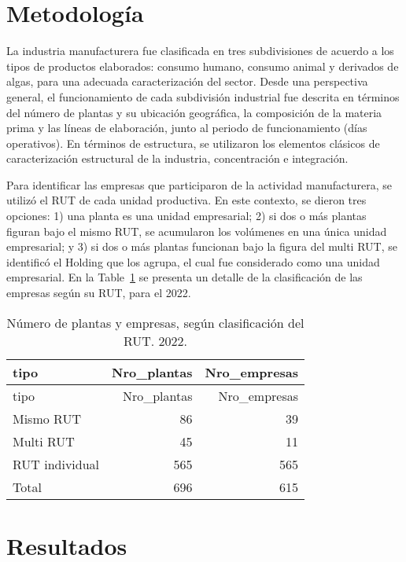 \documentclass[
  super,
  preprint,
  3p]{elsarticle}
\begin{document}
\hypertarget{metodologuxeda}{%
\section{Metodología}\label{metodologuxeda}}

La industria manufacturera fue clasificada en tres subdivisiones de
acuerdo a los tipos de productos elaborados: consumo humano, consumo
animal y derivados de algas, para una adecuada caracterización del
sector. Desde una perspectiva general, el funcionamiento de cada
subdivisión industrial fue descrita en términos del número de plantas y
su ubicación geográfica, la composición de la materia prima y las líneas
de elaboración, junto al periodo de funcionamiento (días operativos). En
términos de estructura, se utilizaron los elementos clásicos de
caracterización estructural de la industria, concentración e
integración.

Para identificar las empresas que participaron de la actividad
manufacturera, se utilizó el RUT de cada unidad productiva. En este
contexto, se dieron tres opciones: 1) una planta es una unidad
empresarial; 2) si dos o más plantas figuran bajo el mismo RUT, se
acumularon los volúmenes en una única unidad empresarial; y 3) si dos o
más plantas funcionan bajo la figura del multi RUT, se identificó el
Holding que los agrupa, el cual fue considerado como una unidad
empresarial. En la Table~\ref{tbl-a} se presenta un detalle de la
clasificación de las empresas según su RUT, para el 2022.

\hypertarget{tbl-a}{}
\begin{longtable}[]{@{}lrr@{}}
\caption{\label{tbl-a}Número de plantas y empresas, según clasificación
del RUT. 2022.}\tabularnewline
\toprule\noalign{}
tipo & Nro\_plantas & Nro\_empresas \\
\midrule\noalign{}
\endfirsthead
\toprule\noalign{}
tipo & Nro\_plantas & Nro\_empresas \\
\midrule\noalign{}
\endhead
\bottomrule\noalign{}
\endlastfoot
Mismo RUT & 86 & 39 \\
Multi RUT & 45 & 11 \\
RUT individual & 565 & 565 \\
Total & 696 & 615 \\
\end{longtable}

\hypertarget{resultados}{%
\section{Resultados}\label{resultados}}
\end{document}
